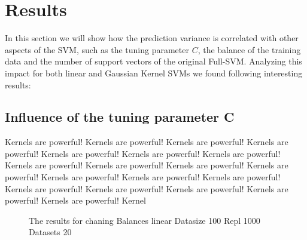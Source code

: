 \documentclass[a4paper]{article}
\begin{document}
\section{Results}

In this section we will show how the prediction variance is correlated with other aspects of the SVM, such as the tuning parameter $C$, the balance of the training data and the number of support vectors of the original Full-SVM. Analyzing this impact for both linear and Gaussian Kernel SVMs we found following interesting results:


\subsection{Influence of the tuning parameter C}
Kernels are powerful! Kernels are powerful! Kernels are powerful! Kernels are powerful! Kernels are powerful! Kernels are powerful! Kernels are powerful! Kernels are powerful! Kernels are powerful! Kernels are powerful! Kernels are powerful! Kernels are powerful! Kernels are powerful! Kernels are powerful! Kernels are powerful! Kernels are powerful! Kernels are powerful! Kernels are powerful! Kernels are powerful! Kernel
 

\begin{figure}[!htb]
\begin{center}

\caption{The results for chaning Balances linear Datasize 100 Repl 1000 Datasets 20}
\label{fig1}
\end{center}
\end{figure}
\end{document}
